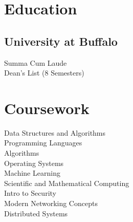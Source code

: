 \documentclass[letterpaper]{deedy-resume} %
\begin{document}
\begin{minipage}[t]{0.27\textwidth} %


\section{Education} 

\subsection{University at Buffalo}

Summa Cum Laude \\
Dean's List (8 Semesters) \\

\sectionspace %


\section{Coursework}

Data Structures and Algorithms \\
Programming Languages \\
Algorithms \\
Operating Systems \\
Machine Learning \\
Scientific and Mathematical Computing \\
Intro to Security \\
Modern Networking Concepts \\
Distributed Systems \\

\sectionspace %



\end{minipage}
\end{document}
